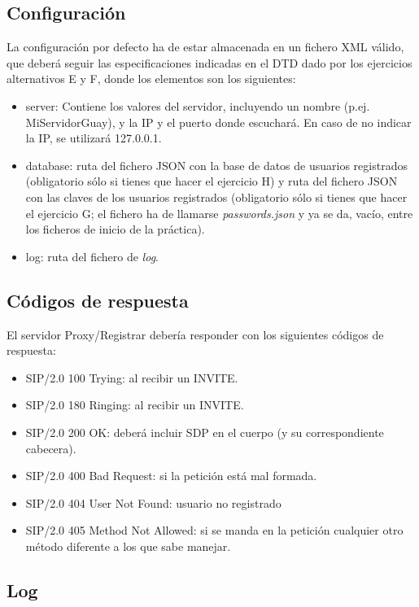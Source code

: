 \documentclass[a4paper,11pt]{article}
\begin{document}
\subsection{Configuración}

  La configuración por defecto ha de estar almacenada en un fichero XML válido, que deberá seguir las especificaciones indicadas en el DTD dado por los ejercicios alternativos E y F, donde los elementos son los siguientes:

\begin{itemize}
  \item server: Contiene los valores del servidor, incluyendo un nombre (p.ej. MiServidorGuay), y la IP y el puerto donde escuchará. En caso de no indicar la IP, se utilizará 127.0.0.1.
  \item database: ruta del fichero JSON con la base de datos de usuarios registrados (obligatorio sólo si tienes que hacer el ejercicio H) y ruta del fichero JSON con las claves de los usuarios registrados (obligatorio sólo si tienes que hacer el ejercicio G; el fichero ha de llamarse \emph{passwords.json} y ya se da, vacío, entre los ficheros de inicio de la práctica).
  \item log: ruta del fichero de \emph{log}.
\end{itemize}

\subsection{Códigos de respuesta}

El servidor Proxy/Registrar debería responder con los siguientes códigos
de respuesta:

   \begin{itemize}
     \item SIP/2.0 100 Trying: al recibir un INVITE.
     \item SIP/2.0 180 Ringing: al recibir un INVITE.
     \item SIP/2.0 200 OK: deberá incluir SDP en el cuerpo (y su correspondiente cabecera).
     \item SIP/2.0 400 Bad Request: si la petición está mal formada.
     \item SIP/2.0 404 User Not Found: usuario no registrado
     \item SIP/2.0 405 Method Not Allowed: si se manda en la petición cualquier otro método diferente a los que sabe manejar.
   \end{itemize}


\subsection{Log}
\end{document}
